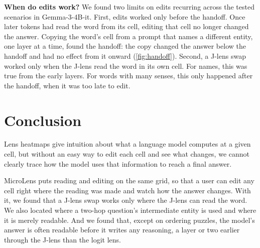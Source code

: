 \documentclass{vgtc}       %
\newcommand{\LL}{logit lens}
\newcommand{\JL}{J-lens}
\begin{document}
\textbf{When do edits work?} We found two limits on edits recurring across the tested scenarios in Gemma-3-4B-it.
First, edits worked only before the handoff. Once later tokens had read the word from its cell, editing that cell no
longer changed the answer. Copying the word's cell from a prompt that names a different entity, one layer at a time,
found the handoff: the copy changed the answer below the handoff and had no effect from it onward
(\cref{fig:handoff}). Second, a \JL{} swap worked only when the \JL{} read the word in its own cell. For names, this
was true from the early layers. For words with many senses, this only happened after the handoff, when it was too late
to edit.

\section{Conclusion}

Lens heatmaps give intuition about what a language model computes at a given cell, but without an easy way to edit
each cell and see what changes, we cannot clearly trace how the model uses that information to reach a final answer.

MicroLens puts reading and editing on the same grid, so that a user can edit any cell right where the reading was
made and watch how the answer changes. With it,
we found that a \JL{} swap works only where
the \JL{} can read the word. We also located where a two-hop question's intermediate entity is used and where it is merely
readable. And we found that, except on ordering puzzles, the model's answer is often readable before it writes any
reasoning, a layer or two earlier through the \JL{} than the \LL.
\end{document}
